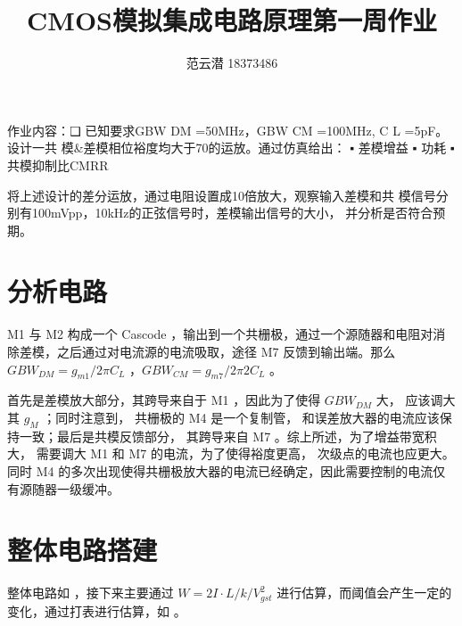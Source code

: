 \documentclass[lang=cn,11pt,a4paper,cite=authoryear]{elegantpaper}
\title{CMOS模拟集成电路原理\quad 第一周作业}
\author{范云潜 18373486}
\institute{微电子学院 184111 班}
\date{\zhtoday}
\begin{document}
\maketitle

作业内容：❑ 已知要求GBW DM =50MHz，GBW CM =100MHz, C L =5pF。设计一共
模\&差模相位裕度均大于70的运放。通过仿真给出：
▪ 差模增益
▪ 功耗
▪ 共模抑制比CMRR

将上述设计的差分运放，通过电阻设置成10倍放大，观察输入差模和共
模信号分别有100mVpp，10kHz的正弦信号时，差模输出信号的大小，
并分析是否符合预期。


\listoffigures


\section{分析电路}

M1 与 M2 构成一个 Cascode ，输出到一个共栅极，通过一个源随器和电阻对消除差模，之后通过对电流源的电流吸取，途径 M7 反馈到输出端。那么 \(GBW_{DM} = g_{m1}/2 \pi C_L\) ，\(GBW_{CM} = g_{m7} / 2 \pi 2 C_L\) 。

首先是差模放大部分，其跨导来自于 M1 ，因此为了使得 \(GBW_{DM}\) 大， 应该调大其 \(g_M\) ；同时注意到， 共栅极的 M4 是一个复制管， 和误差放大器的电流应该保持一致；最后是共模反馈部分， 其跨导来自 M7 。综上所述，为了增益带宽积大， 需要调大 M1 和 M7 的电流，为了使得裕度更高， 次级点的电流也应更大。同时 M4 的多次出现使得共栅极放大器的电流已经确定，因此需要控制的电流仅有源随器一级缓冲。

\section{整体电路搭建}

整体电路如  ，接下来主要通过 \(W = 2  I \cdot L / k  / V_{gst}^2\) 进行估算，而阈值会产生一定的变化，通过打表进行估算，如  。


\end{document}
